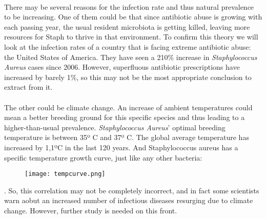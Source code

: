 \paragraph{}There may be several reasons for the infection rate and thus natural prevalence to be increasing. One of them could be that since antibiotic abuse is growing with each passing year, the usual resident microbiota is getting killed, leaving more resources for Staph to thrive in that environment. To confirm this theory we will look at the infection rates of a country that is facing extreme antibiotic abuse: the United States of America. They have seen a 210\% increase in \emph{Staphylococcus Aureus} cases since 2006. However, superfluous antibiotic prescriptions have increased by barely 1\%, so this may not be the most appropriate conclusion to extract from it\cite{baggsEstimatingNationalTrends2016}.
\paragraph{}The other could be climate change. An increase of ambient temperatures could mean a better breeding ground for this specific species and thus leading to a higher-than-usual prevalence. \emph{Staphylococcus Aureus}' optimal breeding temperature is between 35º C and 37º C. The global average temperature has increased by 1,1ºC\cite{gmsGMSAnnualGlobal2016} in the last 120 years. And Staphylococcus aureus has a specific temperature growth curve, just like any other bacteria: \begin{center}\begin{figure}\texttt{[image: tempcurve.png]}\end{figure}\end{center}. So, this correlation may not be completely incorrect, and in fact some scientists warn aobut an increased number of infectious diseases resurging due to climate change. However, further study is needed on this front.
